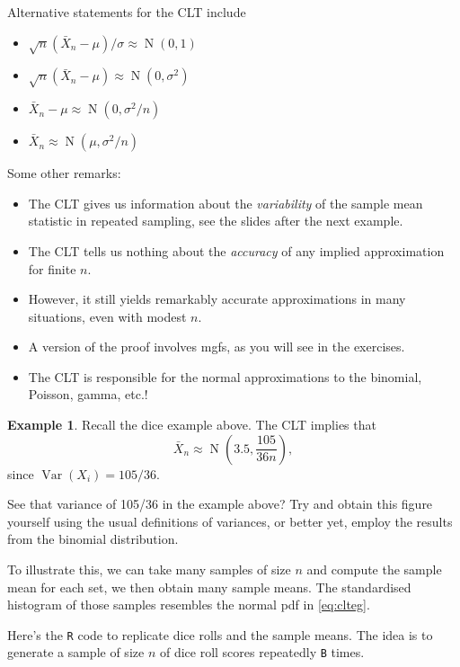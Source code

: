 \documentclass[
]{book}
\providecommand{\tightlist}{%
  \setlength{\itemsep}{0pt}\setlength{\parskip}{0pt}}
\DeclareMathOperator{\Var}{Var}
\DeclareMathOperator{\N}{N}
\theoremstyle{definition}
\theoremstyle{definition}
\newtheorem{example}{Example}[chapter]
\theoremstyle{definition}
\theoremstyle{definition}
\theoremstyle{remark}
\begin{document}
Alternative statements for the CLT include

\begin{itemize}
\tightlist
\item
  \(\sqrt{n}(\bar X_n - \mu)/\sigma \approx \N(0,1)\)
\item
  \(\sqrt{n}(\bar X_n - \mu) \approx \N(0,\sigma^2)\)
\item
  \(\bar X_n - \mu \approx \N(0,\sigma^2/n)\)\\
\item
  \(\bar X_n \approx \N(\mu,\sigma^2/n)\)
\end{itemize}

Some other remarks:

\begin{itemize}
\tightlist
\item
  The CLT gives us information about the \emph{variability} of the sample mean statistic in repeated sampling, see the slides after the next example.
\item
  The CLT tells us nothing about the \emph{accuracy} of any implied approximation for finite \(n\).
\item
  However, it still yields remarkably accurate approximations in many situations, even with modest \(n\).
\item
  A version of the proof involves mgfs, as you will see in the exercises.
\item
  The CLT is responsible for the normal approximations to the binomial, Poisson, gamma, etc.!
\end{itemize}

\begin{example}
Recall the dice example above.
The CLT implies that
\begin{equation}
\bar X_n \approx \N\left(3.5, \frac{105}{36n}\right), \label{eq:clteg}
\end{equation}
since \(\Var(X_i)=105/36\).
\end{example}

See that variance of 105/36 in the example above? Try and obtain this figure yourself using the usual definitions of variances, or better yet, employ the results from the binomial distribution.

To illustrate this, we can take many samples of size \(n\) and compute the sample mean for each
set, we then obtain many sample means.
The standardised histogram of those samples resembles the normal pdf in \eqref{eq:clteg}.

Here's the \texttt{R} code to replicate dice rolls and the sample means.
The idea is to generate a sample of size \(n\) of dice roll scores repeatedly \texttt{B} times.
\end{document}
